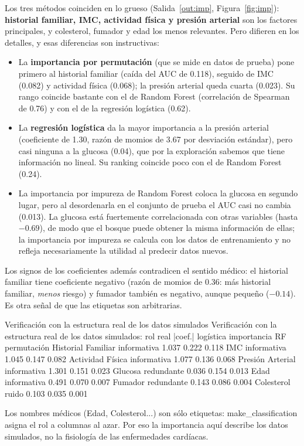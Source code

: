 \documentclass[11pt,letterpaper]{article}
\begin{document}
Los tres métodos coinciden en lo grueso (Salida~\ref{out:imp}, Figura~\ref{fig:imp}): \textbf{historial familiar, IMC, actividad física y presión arterial} son los factores principales, y colesterol, fumador y edad los menos relevantes. Pero difieren en los detalles, y esas diferencias son instructivas:
\begin{itemize}
    \item La \textbf{importancia por permutación} (que se mide en datos de prueba) pone primero al historial familiar (caída del AUC de 0.118), seguido de IMC (0.082) y actividad física (0.068); la presión arterial queda cuarta (0.023). Su rango coincide bastante con el de Random Forest (correlación de Spearman de 0.76) y con el de la regresión logística (0.62).
    \item La \textbf{regresión logística} da la mayor importancia a la presión arterial (coeficiente de 1.30, razón de momios de 3.67 por desviación estándar), pero casi ninguna a la glucosa (0.04), que por la exploración sabemos que tiene información no lineal. Su ranking coincide poco con el de Random Forest (0.24).
    \item La importancia por impureza de Random Forest coloca la glucosa en segundo lugar, pero al desordenarla en el conjunto de prueba el AUC casi no cambia (0.013). La glucosa está fuertemente correlacionada con otras variables (hasta $-0.69$), de modo que el bosque puede obtener la misma información de ellas; la importancia por impureza se calcula con los datos de entrenamiento y no refleja necesariamente la utilidad al predecir datos nuevos.
\end{itemize}

Los signos de los coeficientes además contradicen el sentido médico: el historial familiar tiene coeficiente negativo (razón de momios de 0.36: más historial familiar, \emph{menos} riesgo) y fumador también es negativo, aunque pequeño ($-0.14$). Es otra señal de que las etiquetas son arbitrarias.

\begin{consola}[label=out:ver]{Verificación con la estructura real de los datos simulados}
Verificación con la estructura real de los datos simulados:
                       rol real  |coef.| logística  importancia RF  permutación
Historial Familiar  informativa              1.037           0.222        0.118
IMC                 informativa              1.045           0.147        0.082
Actividad Física    informativa              1.077           0.136        0.068
Presión Arterial    informativa              1.301           0.151        0.023
Glucosa              redundante              0.036           0.154        0.013
Edad                informativa              0.491           0.070        0.007
Fumador              redundante              0.143           0.086        0.004
Colesterol                ruido              0.103           0.035        0.001

Los nombres médicos (Edad, Colesterol...) son sólo etiquetas: make_classification asigna el rol a columnas al azar.
Por eso la importancia aquí describe los datos simulados, no la fisiología de las enfermedades cardíacas.
\end{consola}
\end{document}
